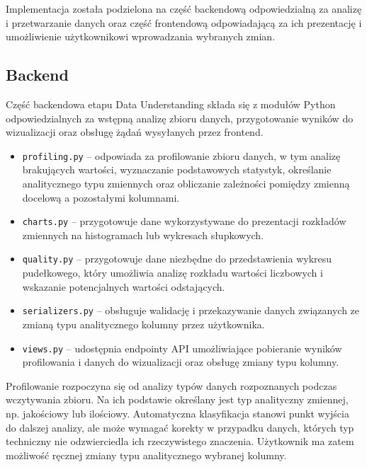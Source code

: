 \documentclass[12pt]{book}
\begin{document}
Implementacja została podzielona na część backendową
odpowiedzialną za analizę i przetwarzanie danych oraz część
frontendową odpowiadającą za ich prezentację i umożliwienie
użytkownikowi wprowadzania wybranych zmian.

\subsection{Backend}

Część backendowa etapu Data Understanding składa się z modułów
Python odpowiedzialnych za wstępną analizę zbioru danych, przygotowanie
wyników do wizualizacji oraz obsługę żądań wysyłanych przez
frontend.

\begin{itemize}

	\item \texttt{profiling.py} -- odpowiada za profilowanie
	zbioru danych, w tym analizę brakujących wartości,
	wyznaczanie podstawowych statystyk, określanie analitycznego
	typu zmiennych oraz obliczanie zależności pomiędzy zmienną
	docelową a pozostałymi kolumnami.

	\item \texttt{charts.py} -- przygotowuje dane wykorzystywane
    do prezentacji rozkładów zmiennych na histogramach lub
    wykresach słupkowych.

	\item \texttt{quality.py} -- przygotowuje dane niezbędne
    do przedstawienia wykresu pudełkowego, który umożliwia
    analizę rozkładu wartości liczbowych i wskazanie
    potencjalnych wartości odstających.

	\item \texttt{serializers.py} -- obsługuje walidację
    i przekazywanie danych związanych ze zmianą typu
    analitycznego kolumny przez użytkownika.

	\item \texttt{views.py} -- udostępnia endpointy API
    umożliwiające pobieranie wyników profilowania i danych
    do wizualizacji oraz obsługę zmiany typu kolumny.

\end{itemize}

Profilowanie rozpoczyna się od analizy typów danych
rozpoznanych podczas wczytywania zbioru. Na ich podstawie
określany jest typ analityczny zmiennej, np. jakościowy lub ilościowy.
Automatyczna klasyfikacja stanowi punkt wyjścia do dalszej analizy,
ale może wymagać korekty w przypadku danych, których typ techniczny
nie odzwierciedla ich rzeczywistego znaczenia. Użytkownik ma zatem
możliwość ręcznej zmiany typu analitycznego wybranej kolumny.
\end{document}
